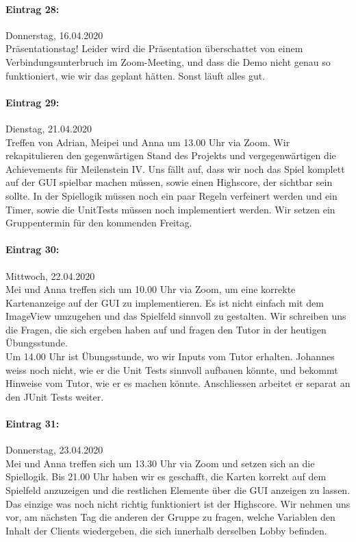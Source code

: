 \documentclass[12pt]{article}
\begin{document}
\paragraph{Eintrag 28:}
Donnerstag, 16.04.2020\\
Pr\"asentationstag! Leider wird die Pr\"asentation \"uberschattet von einem Verbindungsunterbruch im Zoom-Meeting, und dass die Demo nicht genau so funktioniert, wie wir das geplant h\"atten. Sonst l\"auft alles gut.

\paragraph{Eintrag 29:}
Dienstag, 21.04.2020\\
Treffen von Adrian, Meipei und Anna um 13.00 Uhr via Zoom. Wir rekapitulieren den gegenw\"artigen Stand des Projekts und vergegenw\"artigen die Achievements f\"ur Meilenstein IV. Uns f\"allt auf, dass wir noch das Spiel komplett auf der GUI spielbar machen m\"ussen, sowie einen Highscore, der sichtbar sein sollte. In der Spiellogik m\"ussen noch ein paar Regeln verfeinert werden und ein Timer, sowie die UnitTests m\"ussen noch implementiert werden. Wir setzen ein Gruppentermin f\"ur den kommenden Freitag.

\paragraph{Eintrag 30:}
Mittwoch, 22.04.2020\\
Mei und Anna treffen sich um 10.00 Uhr via Zoom, um eine korrekte Kartenanzeige auf der GUI zu implementieren. Es ist nicht einfach mit dem ImageView umzugehen und das Spielfeld sinnvoll zu gestalten. Wir schreiben uns die Fragen, die sich ergeben haben auf und fragen den Tutor in der heutigen \"Ubungsstunde.\\
Um 14.00 Uhr ist \"Ubungsstunde, wo wir Inputs vom Tutor erhalten. Johannes weiss noch nicht, wie er die Unit Tests sinnvoll aufbauen k\"onnte, und bekommt Hinweise vom Tutor, wie er es machen k\"onnte. Anschliessen arbeitet er separat an den JUnit Tests weiter.

\paragraph{Eintrag 31:}
Donnerstag, 23.04.2020\\
Mei und Anna treffen sich um 13.30 Uhr via Zoom und setzen sich an die Spiellogik. Bis 21.00 Uhr haben wir es geschafft, die Karten korrekt auf dem Spielfeld anzuzeigen und die restlichen Elemente \"uber die GUI anzeigen zu lassen. Das einzige was noch nicht richtig funktioniert ist der Highscore. Wir nehmen uns vor, am n\"achsten Tag die anderen der Gruppe zu fragen, welche Variablen den Inhalt der Clients wiedergeben, die sich innerhalb derselben Lobby befinden.
\end{document}
